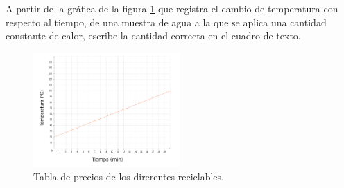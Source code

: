 A partir de la gráfica de la figura \ref{fig:SINMAT1_U3_AC75_IMG3} que registra el cambio de temperatura con respecto al tiempo, de una muestra de agua a la que se aplica una cantidad constante de calor, escribe la cantidad correcta en el cuadro de texto.

\begin{multicols}{2}
    \begin{figure}[H]
        \centering
        \includegraphics[width=0.5\textwidth]{../images/SINMAT1_U3_AC75_IMG3.jpg}
        \caption{Tabla de precios de los direrentes reciclables.}
        \label{fig:SINMAT1_U3_AC75_IMG3}
    \end{figure}
    \begin{parts}
        
        
        
        
        
    \end{parts}
\end{multicols}